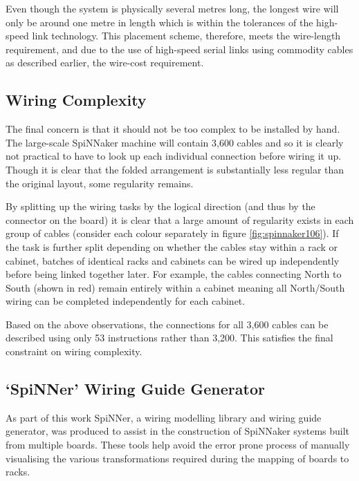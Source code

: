 			Even though the system is physically several metres long, the longest wire
			will only be around one metre in length which is within the tolerances of
			the high-speed link technology. This placement scheme, therefore, meets
			the wire-length requirement, and due to the use of high-speed serial links
			using commodity cables as described earlier, the wire-cost requirement.
			
		\subsection{Wiring Complexity}
			
			The final concern is that it should not be too complex to
			be installed by hand. The large-scale SpiNNaker machine will contain 3,600
			cables and so it is clearly not practical to have to look up each
			individual connection before wiring it up. Though it is clear that the
			folded arrangement is substantially less regular than the original layout,
			some regularity remains.
			
			By splitting up the wiring tasks by the logical direction (and thus by the
			connector on the board) it is clear that a large amount of regularity
			exists in each group of cables (consider each colour separately in figure
			\ref{fig:spinnaker106}). If the task is further split depending on whether
			the cables stay within a rack or cabinet, batches of identical racks and
			cabinets can be wired up independently before being linked together later.
			For example, the cables connecting North to South (shown in red) remain
			entirely within a cabinet meaning all North/South wiring can be completed
			independently for each cabinet.
			
			Based on the above observations, the connections for all 3,600 cables can
			be described using only 53 instructions rather than 3,200. This satisfies
			the final constraint on wiring complexity.
		
		\subsection{`SpiNNer' Wiring Guide Generator}
			
			As part of this work SpiNNer, a wiring modelling library and wiring guide
			generator, was produced to assist in the construction of SpiNNaker systems
			built from multiple boards. These tools help avoid the error prone process
			of manually visualising the various transformations required during the
			mapping of boards to racks.
			
